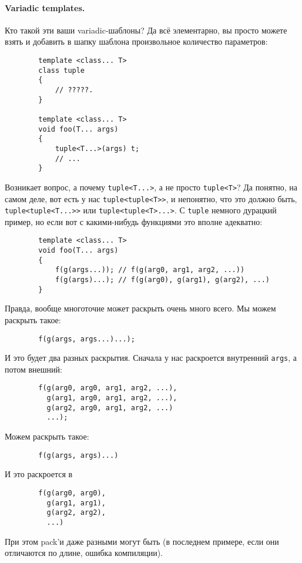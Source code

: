 \documentclass{article}
\begin{document}
    \paragraph{Variadic templates.}
    Кто такой эти ваши variadic-шаблоны? Да всё элементарно, вы просто можете взять и добавить в шапку шаблона произвольное количество параметров:
    \begin{verbatim}
        template <class... T>
        class tuple
        {
            // ?????.
        }

        template <class... T>
        void foo(T... args)
        {
            tuple<T...>(args) t;
            // ...
        }
    \end{verbatim}
    Возникает вопрос, а почему \texttt{tuple<T...>}, а не просто \texttt{tuple<T>}? Да понятно, на самом деле, вот есть у нас \texttt{tuple<tuple<T>>}, и непонятно, что это должно быть, \texttt{tuple<tuple<T...>>} или \texttt{tuple<tuple<T>...>}. С \texttt{tuple} немного дурацкий пример, но если вот с какими-нибудь функциями это вполне адекватно:
    \begin{verbatim}
        template <class... T>
        void foo(T... args)
        {
            f(g(args...)); // f(g(arg0, arg1, arg2, ...))
            f(g(args)...); // f(g(arg0), g(arg1), g(arg2), ...)
        }
    \end{verbatim}
    Правда, вообще многоточие может раскрыть очень много всего. Мы можем раскрыть такое:
    \begin{verbatim}
        f(g(args, args...)...);
    \end{verbatim}
    И это будет два разных раскрытия. Сначала у нас раскроется внутренний \texttt{args}, а потом внешний:
    \begin{verbatim}
        f(g(arg0, arg0, arg1, arg2, ...),
          g(arg1, arg0, arg1, arg2, ...),
          g(arg2, arg0, arg1, arg2, ...)
          ...);
    \end{verbatim}
    Можем раскрыть такое:
    \begin{verbatim}
        f(g(args, args)...)
    \end{verbatim}
    И это раскроется в
    \begin{verbatim}
        f(g(arg0, arg0),
          g(arg1, arg1),
          g(arg2, arg2),
          ...)
    \end{verbatim}
    При этом pack'и даже разными могут быть (в последнем примере, если они отличаются по длине, ошибка компиляции).
\end{document}
